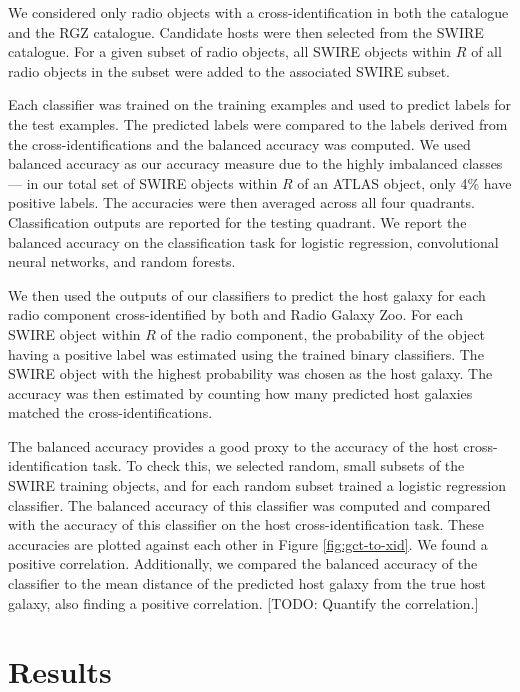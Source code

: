 \documentclass[fleqn,usenatbib,usedcolumn]{mnras}
\begin{document}
    We considered only radio objects with a cross-identification in both the
    \citet{norris06} catalogue and the RGZ catalogue. Candidate hosts
    were then selected from the SWIRE catalogue. For a given subset of radio
    objects, all SWIRE objects within \(R\) of all radio objects in the
    subset were added to the associated SWIRE subset.

    Each classifier was trained on the training examples and used to predict
    labels for the test examples. The predicted labels were compared to the
    labels derived from the \citet{norris06} cross-identifications and
    the balanced accuracy was computed. We used balanced accuracy as our
    accuracy measure due to the highly imbalanced classes --- in our total
    set of SWIRE objects within \(R\) of an ATLAS object, only 4\% have
    positive labels. The accuracies were then averaged across all four
    quadrants. Classification outputs are reported for the testing quadrant.
    We report the balanced accuracy on the classification task for logistic
    regression, convolutional neural networks, and random forests.

    We then used the outputs of our classifiers to predict the host galaxy
    for each radio component cross-identified by both \citet{norris06}
    and Radio Galaxy Zoo. For each SWIRE object within \(R\) of the radio
    component, the probability of the object having a positive label was
    estimated using the trained binary classifiers. The SWIRE object with
    the highest probability was chosen as the host galaxy. The accuracy was
    then estimated by counting how many predicted host galaxies matched the
    \citet{norris06} cross-identifications.

    The balanced accuracy provides a good proxy to the accuracy of the host
    cross-identification task. To check this, we selected random, small
    subsets of the SWIRE training objects, and for each random subset trained
    a logistic regression classifier. The balanced accuracy of this classifier
    was computed and compared with the accuracy of this classifier on the host
    cross-identification task. These accuracies are plotted against each other
    in Figure \ref{fig:gct-to-xid}. We found a positive correlation.
    Additionally, we compared the balanced accuracy of the classifier to the
    mean distance of the predicted host galaxy from the true host galaxy, also
    finding a positive correlation. [TODO: Quantify the correlation.]

\section{Results}\label{results}
\end{document}
